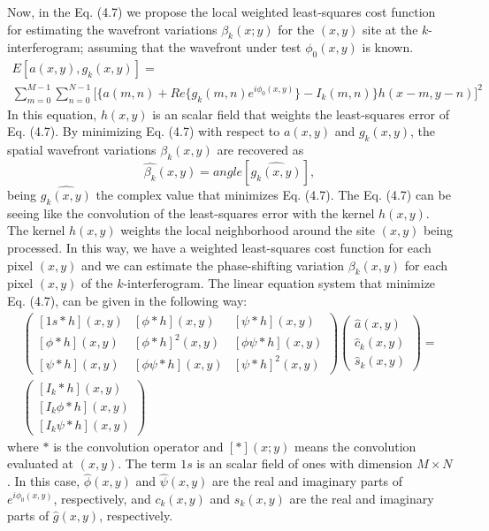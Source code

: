 Now, in the Eq. (4.7) we propose the local weighted least-squares cost function
for estimating the wavefront variations $\beta_k(x;y)$ for the $(x,y)$ site at
the $k$-interferogram; assuming that the wavefront under test $\phi_0(x,y)$ is
known.
\begin{multline}
E[a(x,y),g_{k}(x,y)]= \\ \sum_{m=0}^{M-1}\sum_{n=0}^{N-1}\Bigg[\{a(m,n)+Re\{g_{k}(m,
n)e^ { i\phi_{0}(x,y)}\}-I_{k}(m,n)\}h(x-m,y-n)\Bigg]^{2}
\end{multline}
In this equation, $h(x,y)$ is an scalar field that weights the least-squares
error of Eq. (4.7). By minimizing Eq. (4.7) with respect to $a(x,y)$ and
$g_k(x,y)$, the spatial wavefront variations $\beta_k(x,y)$ are recovered as
\begin{equation}
 \hat{\beta_k}(x,y)=angle[\hat{g_k(x,y)}],
\end{equation}
being $\hat{g_k(x,y)}$ the complex value that minimizes Eq. (4.7). The Eq. (4.7)
can be seeing like the convolution of the least-squares error with the kernel
$h(x,y)$. The kernel $h(x,y)$ weights the local neighborhood around the site
$(x,y)$ being processed. In this way, we have a weighted least-squares cost
function for each pixel $(x,y)$ and we can estimate the phase-shifting variation
$\beta_k(x,y)$ for each pixel $(x,y)$ of the $k$-interferogram. The linear
equation system that minimize Eq. (4.7), can be given in the following way:
\begin{multline}
 \left(\begin{array}{ccc}
[1s*h](x,y) & [\phi*h](x,y) & [\psi*h](x,y)\\{}
[\phi*h](x,y) & [\phi*h]^{2}(x,y) & [\phi\psi*h](x,y)\\{}
[\psi*h](x,y) & [\phi\psi*h](x,y) & [\psi*h]^{2}(x,y)
\end{array}\right)\left(\begin{array}{c}
\hat{a}(x,y)\\
\hat{c}_{k}(x,y)\\
\hat{s}_{k}(x,y)
\end{array}\right)= \\ \left(\begin{array}{c}
[I_{k}*h](x,y)\\{}
[I_{k}\phi*h](x,y)\\{}
[I_{k}\psi*h](x,y)
\end{array}\right)
\end{multline}
where $*$ is the convolution operator and $[*](x;y)$ means the convolution
evaluated at $(x,y)$. The term $1s$ is an scalar field of ones with dimension
$M \times N$. In this case, $\hat{\phi}(x,y)$ and $\hat{\psi}(x,y)$ are
the real and imaginary parts of $e^{i \phi_0(x,y)}$, respectively, and
$c_k(x,y)$ and $s_k(x,y)$ are the real and imaginary parts of $\hat{g}(x,y)$,
respectively.

